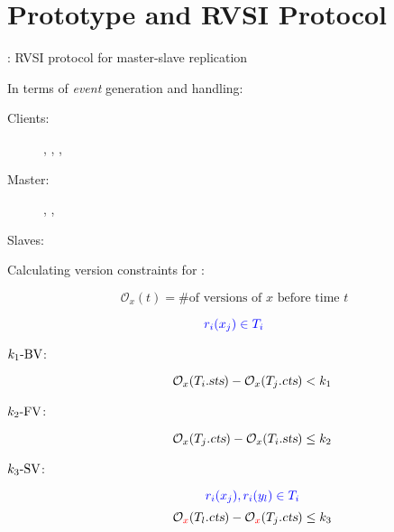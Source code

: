 \section{\chameleon{} Prototype and RVSI Protocol}



\begin{frame}{}
  \centerline{\rvsims{}: RVSI protocol for master-slave replication}

  \vspace{1.0cm}
  In terms of \emph{event} generation and handling:
  \begin{description}
    \item[Clients:] \ebegin, \eread, \ewrite, \eend%
    \item[Master:] \estart, \ecommit, \esend%
    \item[Slaves:] \ereceive%
  \end{description}
\end{frame}

\begin{frame}{}
  \begin{center}
    
  \end{center}
\end{frame}

\begin{frame}{}
  Calculating version constraints for \rvsi{}: 

  \[
    \mathcal{O}_{x}(t) = \text{\# of versions of } x \text{ before time } t %
  \]

  \[
    \textcolor{blue}{r_i(x_j) \in T_i}
  \]
  \vspace{-0.40cm}
  \begin{description}
    \item[$k_1\text{-BV}$:]
      \[
	\mathcal{O}_{x}(T_i.\textsl{sts}) - \mathcal{O}_{x}(T_j.\textsl{cts}) < k_1
      \]
    \item[$k_2\text{-FV}$:]
      \[
	\mathcal{O}_{x}(T_j.\textsl{cts}) - \mathcal{O}_{x}(T_i.\textsl{sts}) \le k_2
      \]
    \pause
    \item[$k_3\text{-SV}$:]
      \[
	\textcolor{blue}{r_i(x_j), r_i(y_l) \in T_i}
      \]
      \vspace{-0.40cm}
      \[
	\mathcal{O}_{\textcolor{red}{x}}(T_l.\textsl{cts}) - \mathcal{O}_{\textcolor{red}{x}}(T_j.\textsl{cts}) \le k_3
      \]
  \end{description}
\end{frame}

